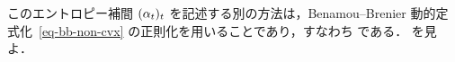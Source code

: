 このエントロピー補間 $(\alpha_t)_t$ を記述する別の方法は，Benamou--Brenier 動的定式化~\eqref{eq-bb-non-cvx} の正則化を用いることであり，すなわち 
である．\citep{gentil2015analogy,chen2016relation} を見よ．
